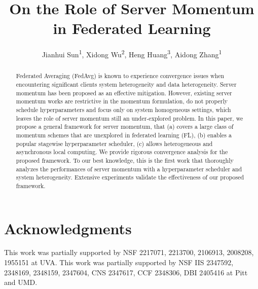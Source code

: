 \documentclass[letterpaper]{article} %
\title{On the Role of Server Momentum in Federated Learning}
\author{
    Jianhui Sun\textsuperscript{\rm 1}\equalcontrib,
    Xidong Wu\textsuperscript{\rm 2}\equalcontrib,
    Heng Huang\textsuperscript{\rm 3},
    Aidong Zhang\textsuperscript{\rm 1}
}
\theoremstyle{theorem}
\theoremstyle{definition}
\theoremstyle{remark}
\begin{document}
\maketitle

\begin{abstract}
Federated Averaging (FedAvg) is known to experience convergence issues when encountering significant clients system heterogeneity and data heterogeneity. Server momentum has been proposed as an effective mitigation. However, existing server momentum works are restrictive in the momentum formulation, do not properly schedule hyperparameters and focus only on system homogeneous settings, which leaves the role of server momentum still an under-explored problem. In this paper, we propose a general framework for server momentum, that (a) covers a large class of momentum schemes that are unexplored in federated learning (FL), (b) enables a popular stagewise hyperparameter scheduler, (c) allows heterogeneous and asynchronous local computing. We provide rigorous convergence analysis for the proposed framework. To our best knowledge, this is the first work that thoroughly analyzes the performances of server momentum with a hyperparameter scheduler and system heterogeneity. Extensive experiments validate the effectiveness of our proposed framework.
\end{abstract}









\section{Acknowledgments}
This work was partially supported by NSF 2217071, 2213700, 2106913, 2008208, 1955151 at UVA.
This work was partially supported by NSF IIS 2347592, 2348169, 2348159, 2347604, CNS 2347617, CCF 2348306, DBI 2405416 at Pitt and UMD.



\end{document}
